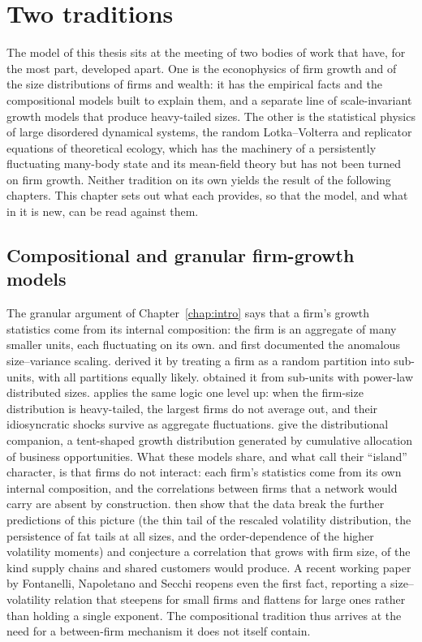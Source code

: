 \chapter{Two traditions}
\label{chap:background}

The model of this thesis sits at the meeting of two bodies of work that have, for the most
part, developed apart. One is the econophysics of firm growth and of the size distributions of
firms and wealth: it has the empirical facts and the compositional models built to explain them,
and a separate line of scale-invariant growth models that produce heavy-tailed sizes. The other
is the statistical physics of large disordered dynamical systems, the random Lotka--Volterra and
replicator equations of theoretical ecology, which has the machinery of a persistently
fluctuating many-body state and its mean-field theory but has not been turned on firm growth.
Neither tradition on its own yields the result of the following chapters. This chapter sets out
what each provides, so that the model, and what in it is new, can be read against them.

\section{Compositional and granular firm-growth models}
\label{sec:bg-granular}

The granular argument of Chapter~\ref{chap:intro} says that a firm's growth statistics
come from its internal composition: the firm is an aggregate of many smaller units, each
fluctuating on its own. \citet{stanley1996} and \citet{amaral1997} first documented the
anomalous size--variance scaling. \citet{sutton2002} derived it by treating a firm as a
random partition into sub-units, with all partitions equally likely.
\citet{wyartbouchaud2003} obtained it from sub-units with power-law distributed sizes.
\citet{gabaix2011} applies the same logic one level up: when the firm-size distribution is
heavy-tailed, the largest firms do not average out, and their idiosyncratic shocks survive
as aggregate fluctuations. \citet{bottazzi2006} give the distributional companion, a
tent-shaped growth distribution generated by cumulative allocation of business opportunities. What these models share,
and what \citet{moran2024} call their ``island'' character, is that firms do not interact: each
firm's statistics come from its own internal composition, and the correlations between firms
that a network would carry are absent by construction. \citet{moran2024} then show that the
data break the further predictions of this picture (the thin tail of the rescaled volatility
distribution, the persistence of fat tails at all sizes, and the order-dependence of the
higher volatility moments) and conjecture a correlation that
grows with firm size, of the kind supply chains and shared customers would produce. A recent
working paper by Fontanelli, Napoletano and Secchi \citep{fontanelli2025} reopens even the first
fact, reporting a
size--volatility relation that steepens for small firms and flattens for large ones rather than
holding a single exponent. The compositional tradition thus arrives at the
need for a between-firm mechanism it does not itself contain.


